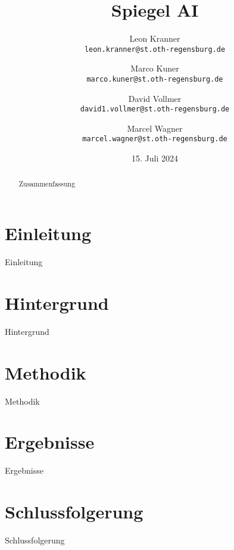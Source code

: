 \documentclass{article}
\begin{document}
\title{Spiegel AI}
\author{
  Leon Kranner \\
  \texttt{leon.kranner@st.oth-regensburg.de}
  \and
  Marco Kuner \\
  \texttt{marco.kuner@st.oth-regensburg.de}
  \and
  David Vollmer \\
  \texttt{david1.vollmer@st.oth-regensburg.de}
  \and
  Marcel Wagner \\
  \texttt{marcel.wagner@st.oth-regensburg.de}
}
\date{15. Juli 2024}

\maketitle

\begin{abstract}
Zusammenfassung
\end{abstract}

\section{Einleitung}
Einleitung

\section{Hintergrund}
Hintergrund

\section{Methodik}
Methodik

\section{Ergebnisse}
Ergebnisse

\section{Schlussfolgerung}
Schlussfolgerung
\end{document}
